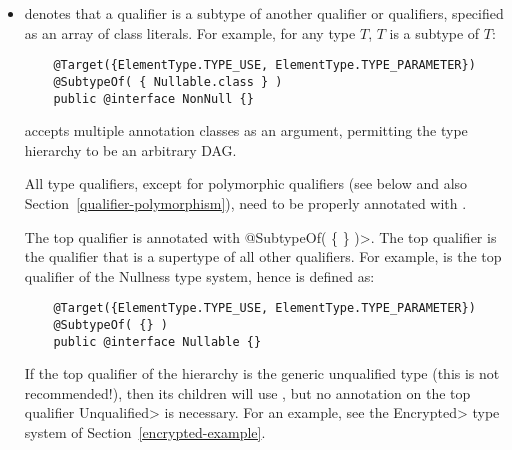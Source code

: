 \begin{itemize}

\item {} denotes that a qualifier is a subtype of
  another qualifier or qualifiers, specified as an array of class
  literals.  For example, for any type $T$,
   $T$ is a subtype of  $T$:

  \begin{Verbatim}
    @Target({ElementType.TYPE_USE, ElementType.TYPE_PARAMETER})
    @SubtypeOf( { Nullable.class } )
    public @interface NonNull {}
  \end{Verbatim}



   accepts multiple annotation classes as an argument,
  permitting the type hierarchy to be an arbitrary DAG\@.


  All type qualifiers, except for polymorphic qualifiers (see below and
  also Section~\ref{qualifier-polymorphism}), need to be
  properly annotated with .

  The top qualifier is annotated with
  \<@SubtypeOf( \{ \} )>.  The top qualifier is the qualifier that is
  a supertype of all other qualifiers.  For example, 
  is the top qualifier of the Nullness type system, hence is defined as:

  \begin{Verbatim}
    @Target({ElementType.TYPE_USE, ElementType.TYPE_PARAMETER})
    @SubtypeOf( {} )
    public @interface Nullable {}
  \end{Verbatim}

  \begin{sloppypar}
  If the top qualifier of the hierarchy is the generic unqualified type
  (this is not recommended!), then its children
  will use , but no
   annotation on the top qualifier \<Unqualified> is
  necessary.  For an example, see the
  \<Encrypted> type system of Section~\ref{encrypted-example}.
  \end{sloppypar}


\end{itemize}
